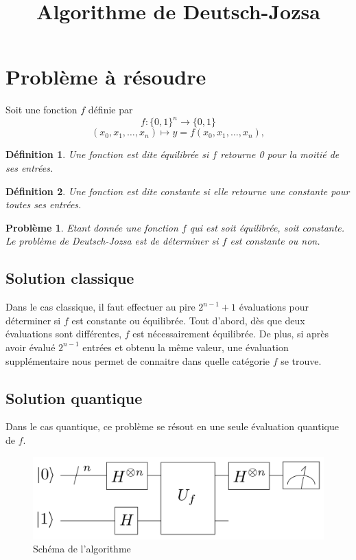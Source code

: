 \documentclass[12pt,a4paper]{article}
\title{Algorithme de Deutsch-Jozsa}
\date{}
\newtheorem{definition}{Définition}
\newtheorem{pb}{Problème}
\begin{document}
\maketitle

\section{Problème à résoudre}
Soit une fonction $f$ définie par 
\[
  f: \{0, 1\}^n \to \{ 0, 1 \} \]
\[ 
(x_0, x_1, \dots , x_n) \mapsto y = f(x_0, x_1, \dots , x_n), 
\]

\begin{definition}
  Une fonction est dite équilibrée si $f$ retourne 0 pour la moitié de ses entrées.
\end{definition}

\begin{definition}
  Une fonction est dite constante si elle retourne une constante pour toutes ses
  entrées.
\end{definition}


\begin{pb}
Etant donnée une fonction $f$ qui est soit équilibrée, soit constante.
Le problème de Deutsch-Jozsa est de déterminer si $f$ est constante ou
non.  
\end{pb}

\subsection{Solution classique}
Dans le cas classique, il faut effectuer au pire $2^{n-1}+1$
évaluations pour déterminer si $f$ est constante ou équilibrée. Tout
d'abord, dès que deux évaluations sont différentes, $f$ est
nécessairement équilibrée. De plus, si après avoir évalué $2^{n-1}$
entrées et obtenu la même valeur, une évaluation supplémentaire nous
permet de connaitre dans quelle catégorie $f$ se trouve.

\subsection{Solution quantique}
Dans le cas quantique, ce problème se résout en une seule évaluation
quantique de $f$.

\begin{figure}[htbp]
    \centering
    \includegraphics[scale=0.2]{Deutsch-Jozsa_Algorithm.png}
    \caption{Schéma de l'algorithme}
    \label{fig:univerise}
\end{figure}
\end{document}
